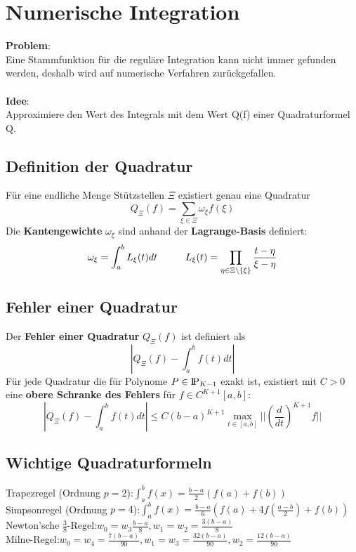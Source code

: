 \documentclass[10pt,a4paper]{article}
\def\polynomials{{\rm I\!P}}
\begin{document}
	\section{Numerische Integration}
	\textbf{Problem}:\\Eine Stammfunktion für die reguläre Integration kann nicht immer gefunden werden, deshalb wird auf numerische Verfahren zurückgefallen.\\\\
	\textbf{Idee}:\\Approximiere den Wert des Integrals mit dem Wert Q(f) einer Quadraturformel Q.

	\subsection{Definition der Quadratur}
	Für eine endliche Menge Stützstellen $\Xi$ existiert genau eine Quadratur $$Q_\Xi(f) = \sum_{\xi \in \Xi} \omega_\xi f(\xi)$$
	Die \textbf{Kantengewichte} $\omega_\xi$ sind anhand der \textbf{Lagrange-Basis} definiert:
	$$\omega_\xi = \int_a^bL_\xi(t)dt\hspace*{1cm}L_\xi(t) = \prod_{\eta \in \Xi \setminus \{\xi\}} \frac{t - \eta}{\xi - \eta}$$

	\subsection{Fehler einer Quadratur}
	Der \textbf{Fehler einer Quadratur} $Q_\Xi(f)$ ist definiert als $$|Q_\Xi(f) - \int^b_af(t)dt|$$
	Für jede Quadratur die für Polynome $P \in \polynomials_{K-1}$ exakt ist, existiert mit $C > 0$ eine \textbf{obere Schranke des Fehlers} für $f \in C^{K+1}[a,b]$:
	$$|Q_\Xi(f) - \int^b_af(t)dt| \leq C(b - a)^{K+1}\max_{t\in[a,b]}||(\frac{d}{dt})^{K+1}f||$$

	\subsection{Wichtige Quadraturformeln}
        Trapezregel (Ordnung $p = 2$):\hfill$\int_{a}^{b} f(x) = \frac{b - a}{2} (f(a) + f(b))$ \\
        Simpsonregel (Ordnung $p = 4$):\hfill$\int_{a}^{b} f(x) = \frac{b - a}{6} (f(a) + 4f(\frac{a-b}{2}) + f(b))$ \\
        Newton'sche $\frac{3}{8}$-Regel:\hfill$w_0 = w_3 \frac{b - a}{8}, w_1 = w_2 = \frac{3(b - a)}{8}$ \\
        Milne-Regel:\hfill$w_0 = w_4 = \frac{7(b - a)}{90}, w_1 = w_3 = \frac{32(b - a)}{90}, w_2 = \frac{12(b - a)}{90}$ \\
\end{document}
